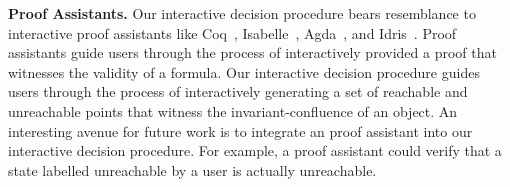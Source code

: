 \textbf{Proof Assistants.}
Our interactive decision procedure bears resemblance to interactive proof
assistants like Coq~\cite{coq2017}, Isabelle~\cite{nipkow2002isabelle},
Agda~\cite{norell2008dependently}, and Idris~\cite{brady2013idris}. Proof
assistants guide users through the process of interactively provided a proof
that witnesses the validity of a formula. Our interactive decision procedure
guides users through the process of interactively generating a set of reachable
and unreachable points that witness the invariant-confluence of an object. An
interesting avenue for future work is to integrate an proof assistant into our
interactive decision procedure. For example, a proof assistant could verify
that a state labelled unreachable by a user is actually unreachable.
